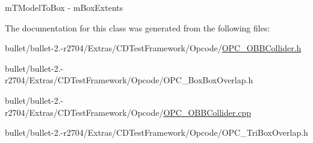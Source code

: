 \begin{DoxyItemize}
\item m\+T\+Model\+To\+Box -\/ m\+Box\+Extents 
\end{DoxyItemize}

The documentation for this class was generated from the following files\+:\begin{DoxyCompactItemize}
\item 
bullet/bullet-\/2.-\/r2704/\+Extras/\+C\+D\+Test\+Framework/\+Opcode/\hyperlink{_o_p_c___o_b_b_collider_8h}{O\+P\+C\+\_\+\+O\+B\+B\+Collider.\+h}\item 
bullet/bullet-\/2.-\/r2704/\+Extras/\+C\+D\+Test\+Framework/\+Opcode/O\+P\+C\+\_\+\+Box\+Box\+Overlap.\+h\item 
bullet/bullet-\/2.-\/r2704/\+Extras/\+C\+D\+Test\+Framework/\+Opcode/\hyperlink{_o_p_c___o_b_b_collider_8cpp}{O\+P\+C\+\_\+\+O\+B\+B\+Collider.\+cpp}\item 
bullet/bullet-\/2.-\/r2704/\+Extras/\+C\+D\+Test\+Framework/\+Opcode/O\+P\+C\+\_\+\+Tri\+Box\+Overlap.\+h\end{DoxyCompactItemize}
